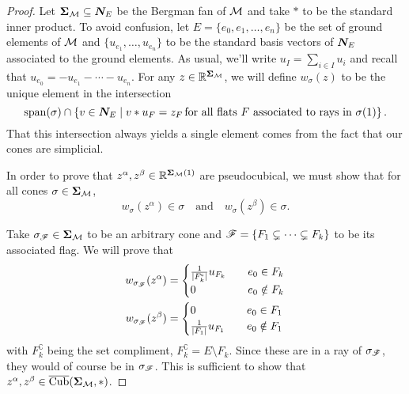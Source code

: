 \documentclass[12pt,oneside]{../../sfsuthesis}
\begin{document}
\begin{proof}
    Let \( {\bm{\Sigma}}_{\mathcal{M}} \subseteq \bm{N}_E \) be the Bergman fan of \( \mathcal{M} \) and take \( \ast \) to be the standard inner product.
    To avoid confusion, let \( E = \{ e_0, e_1, \dots, e_n \} \) be the set of ground elements of \( \mathcal{M} \) and \( \{ u_{e_1}, \dots, u_{e_n} \} \) to be the standard basis vectors of \( \bm{N}_E \) associated to the ground elements.
    As usual, we'll write \( u_I = \sum_{i \in I} u_i \) and recall that \( u_{e_0} = -u_{e_1} - \cdots - u_{e_n} \).
    For any \( z \in \mathbb{R}^{{\bm{\Sigma}}_{\mathcal{M}}} \), we will define \( w_{\sigma}(z) \) to be the unique element in the intersection
    \[
        \operatorname{span}(\sigma) \cap \left\{ v \in \bm{N}_E \; \middle| \; v \ast u_F = z_F \, \text{for all flats \( F \) associated to rays in \( \sigma(1) \)} \right\}.
    \]
    That this intersection always yields a single element comes from the fact that our cones are simplicial.

    In order to prove that \( z^\alpha, z^\beta \in \mathbb{R}^{{\bm{\Sigma}}_{\mathcal{M}}(1)} \) are pseudocubical, we must show that for all cones \( \sigma \in {\bm{\Sigma}}_{\mathcal{M}} \),
    \[
        w_\sigma(z^\alpha) \in \sigma \quad \text{and} \quad w_\sigma(z^\beta) \in \sigma.
    \]

    Take \( \sigma_{\mathscr{F}} \in {\bm{\Sigma}}_{\mathcal{M}} \) to be an arbitrary cone and \( \mathscr{F} = \{ F_1 \subsetneq \cdots \subsetneq F_k \} \) to be its associated flag.
    We will prove that
    \begin{align*}
        w_{\sigma_{\mathscr{F}}}(z^\alpha) & = \begin{cases}
                                           \frac{1}{|F_k^{\mathsf{c}}|}u_{F_k} & \quad e_0 \in F_k    \\
                                           0                                  & \quad e_0 \notin F_k
                                       \end{cases}
        \\
        w_{\sigma_{\mathscr{F}}}(z^\beta)  & = \begin{cases}
                                           0                      & \quad e_0 \in F_1    \\
                                           \frac{1}{|F_1|}u_{F_1} & \quad e_0 \notin F_1
                                       \end{cases}
    \end{align*}
    with \( F_k^\complement \) being the set compliment, \( F_k^\complement = E \setminus F_k \).
    Since these are in a ray of \( \sigma_{\mathscr{F}} \), they would of course be in \( \sigma_{\mathscr{F}} \).
    This is sufficient to show that \(  z^\alpha, z^\beta \in \operatorname{\overline{Cub}}({\bm{\Sigma}}_{\mathcal{M}}, \ast) \).


\end{proof}
\end{document}
